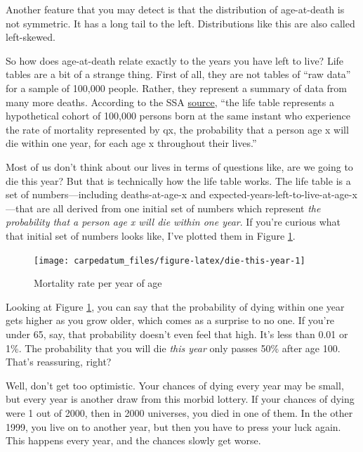 \documentclass[openany]{book}
\begin{document}
Another feature that you may detect is that the distribution of age-at-death is not symmetric. It has a long tail to the left. Distributions like this are also called left-skewed.

So how does age-at-death relate exactly to the years you have left to live? Life tables are a bit of a strange thing. First of all, they are not tables of ``raw data'' for a sample of 100,000 people. Rather, they represent a summary of data from many more deaths. According to the SSA \href{https://www.ssa.gov/OACT/HistEst/PerLifeTables/LifeTableDefinitions.pdf}{source}, ``the life table represents a hypothetical cohort of 100,000 persons born at the same instant who experience the rate of mortality represented by qx, the probability that a person age x will die within one year, for each age x throughout their lives.''

Most of us don't think about our lives in terms of questions like, are we going to die this year? But that is technically how the life table works. The life table is a set of numbers---including deaths-at-age-x and expected-years-left-to-live-at-age-x---that are all derived from one initial set of numbers which represent \emph{the probability that a person age x will die within one year}. If you're curious what that initial set of numbers looks like, I've plotted them in Figure \ref{fig:die-this-year}.

\begin{figure}[H]

{\centering \texttt{[image: carpedatum\_files/figure-latex/die-this-year-1]} 

}

\caption{Mortality rate per year of age}\label{fig:die-this-year}
\end{figure}

Looking at Figure \ref{fig:die-this-year}, you can say that the probability of dying within one year gets higher as you grow older, which comes as a surprise to no one. If you're under 65, say, that probability doesn't even feel that high. It's less than 0.01 or 1\%. The probability that you will die \emph{this year} only passes 50\% after age 100. That's reassuring, right?

Well, don't get too optimistic. Your chances of dying every year may be small, but every year is another draw from this morbid lottery. If your chances of dying were 1 out of 2000, then in 2000 universes, you died in one of them. In the other 1999, you live on to another year, but then you have to press your luck again. This happens every year, and the chances slowly get worse.
\end{document}
